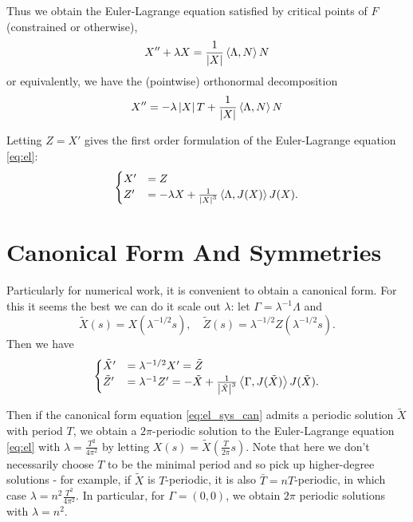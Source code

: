 \documentclass[12pt]{article}
\begin{document}
Thus we obtain the Euler-Lagrange equation satisfied by critical points of \(F\) (constrained or otherwise),
\begin{equation}
\label{eq:el}
X'' + \lambda X = \frac{1}{\left|{X}\right|} \left\langle{\Lambda},{N}\right\rangle N
\end{equation}
or equivalently, we have the (pointwise) orthonormal decomposition
\begin{equation}
\label{eq:pointwise_orth}
X'' = -\lambda \left|{X}\right| T + \frac{1}{\left|{X}\right|} \left\langle{\Lambda},{N}\right\rangle N
\end{equation}

Letting \(Z = X'\) gives the first order formulation of the Euler-Lagrange equation \eqref{eq:el}:
\begin{equation}
\label{eq:el_sys}
\begin{cases}
X' &= Z \\
Z' &= -\lambda X + \frac{1}{\left|{X}\right|^3} \left\langle{\Lambda},{J(X)}\right\rangle J(X).
\end{cases}
\end{equation}

\section{Canonical Form And Symmetries}

Particularly for numerical work, it is convenient to obtain a canonical form. For this it seems the best we can do it scale out \(\lambda\): let \(\Gamma = \lambda^{-1} \Lambda\) and
\[
\tilde{X}(s) = X(\lambda^{-1/2} s), \quad \tilde{Z}(s) = \lambda^{-1/2} Z(\lambda^{-1/2} s).
\]
Then we have
\begin{equation}
\label{eq:el_sys_can}
\begin{cases}
\tilde{X}' &= \lambda^{-1/2} X' = \tilde{Z} \\
\tilde{Z}' &= \lambda^{-1} Z' = -\tilde{X} + \frac{1}{\left|{\tilde{X}}\right|^3} \left\langle{\Gamma},{J(\tilde{X})}\right\rangle J(\tilde{X}).
\end{cases}
\end{equation}

Then if the canonical form equation \eqref{eq:el_sys_can} admits a periodic solution \(\tilde{X}\) with period \(T\), we obtain a \(2\pi\)-periodic solution to the Euler-Lagrange equation \eqref{eq:el} with \(\lambda = \tfrac{T^2}{4\pi^2}\) by letting \(X(s) = \tilde{X}\left(\tfrac{T}{2\pi}s\right)\). Note that here we don't necessarily choose \(T\) to be the minimal period and so pick up higher-degree solutions - for example, if \(\tilde{X}\) is \(T\)-periodic, it is also \(\bar{T} = nT\)-periodic, in which case \(\lambda = n^2 \tfrac{T^2}{4\pi^2}\). In particular, for \(\Gamma = (0, 0)\), we obtain \(2\pi\) periodic solutions with \(\lambda = n^2\).
\end{document}
